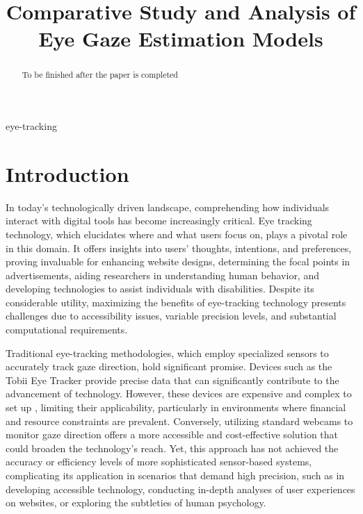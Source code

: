 \documentclass[conference]{IEEEtran}
\begin{document}
\title{Comparative Study and Analysis of Eye Gaze Estimation Models}

\author{
\and
{}
\and
{}
\and
{}
}

\maketitle

\begin{abstract}
To be finished after the paper is completed
\end{abstract}

\begin{IEEEkeywords}
eye-tracking
\end{IEEEkeywords}

\section{Introduction}

In today's technologically driven landscape, comprehending how individuals interact with digital tools has become increasingly critical. Eye tracking technology, which elucidates where and what users focus on, plays a pivotal role in this domain. It offers insights into users' thoughts, intentions, and preferences, proving invaluable for enhancing website designs, determining the focal points in advertisements, aiding researchers in understanding human behavior, and developing technologies to assist individuals with disabilities. Despite its considerable utility, maximizing the benefits of eye-tracking technology presents challenges due to accessibility issues, variable precision levels, and substantial computational requirements.

Traditional eye-tracking methodologies, which employ specialized sensors to accurately track gaze direction, hold significant promise. Devices such as the Tobii Eye Tracker\cite{tobii-eye-tracker} provide precise data that can significantly contribute to the advancement of technology. However, these devices are expensive and complex to set up \cite{tobii-eye-tracker}, limiting their applicability, particularly in environments where financial and resource constraints are prevalent. Conversely, utilizing standard webcams to monitor gaze direction offers a more accessible and cost-effective solution \cite{webcams-for-eyetracking} that could broaden the technology's reach. Yet, this approach has not achieved the accuracy or efficiency levels of more sophisticated sensor-based systems, complicating its application in scenarios that demand high precision, such as in developing accessible technology, conducting in-depth analyses of user experiences on websites, or exploring the subtleties of human psychology.
\end{document}

